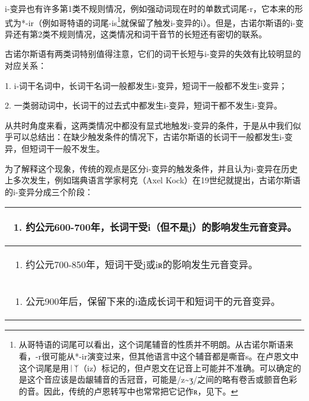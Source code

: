 i-变异也有许多第1类不规则情况，例如强动词现在时的单数式词尾-r，它本来的形式为*-ir（例如哥特语的词尾-is\footnote{从哥特语的词尾可以看出，这个词尾辅音的性质并不明朗。从古诺尔斯语来看，-r很可能从*-ir演变过来，但其他语言中这个辅音都是嘶音s。在卢恩文中这个词尾是用ᛁᛉ（iz）标记的，但卢恩文在记音上可能并不准确。可以确定的是这个音应该是齿龈辅音的舌冠音，可能是/z\textasciitilde ʒ/之间的略有卷舌或颤音色彩的音。因此，传统的卢恩转写中也常常把它记作ʀ，见下。}就保留了触发i-变异的i）。但是，古诺尔斯语的i-变异还有第2类不规则情况，这类情况和词干音节的长短还有密切的联系。

古诺尔斯语有两类词特别值得注意，它们的词干长短与i-变异的失效有比较明显的对应关系：

1. i-词干名词中，长词干名词一般都发生i-变异，短词干一般都不发生i-变异；

2. 一类弱动词中，长词干的过去式中都发生i-变异，短词干都不发生i-变异。

从共时角度来看，这两类情况中都没有显式地触发i-变异的条件，于是从中我们似乎可以总结出：在缺少触发条件的情况下，古诺尔斯语的长词干一般都发生i-变异，但短词干一般不发生。

为了解释这个现象，传统的观点是区分i-变异的触发条件，并且认为i-变异在历史上多次发生，例如瑞典语言学家柯克（Axel
Kock）在19世纪就提出，古诺尔斯语的i-变异分成三个阶段：

\begin{longtable}{l}
\toprule
\begin{enumerate}\def\labelenumi{\Alph{enumi}.}\item  约公元600-700年，长词干受i（但不是j）的影响发生元音变异。\end{enumerate} \\
\midrule
\endhead
\bottomrule
\endfoot
\begin{minipage}[t]{\linewidth}\raggedright
\begin{enumerate}
\def\labelenumi{\Alph{enumi}.}
\setcounter{enumi}{1}
\item
  约公元700-850年，短词干受j或iʀ的影响发生元音变异。
\end{enumerate}
\end{minipage} \\
\begin{minipage}[t]{\linewidth}\raggedright
\begin{enumerate}
\def\labelenumi{\Alph{enumi}.}
\setcounter{enumi}{2}
\item
  公元900年后，保留下来的i造成长词干和短词干的元音变异。
\end{enumerate}
\end{minipage} \\
\end{longtable}

